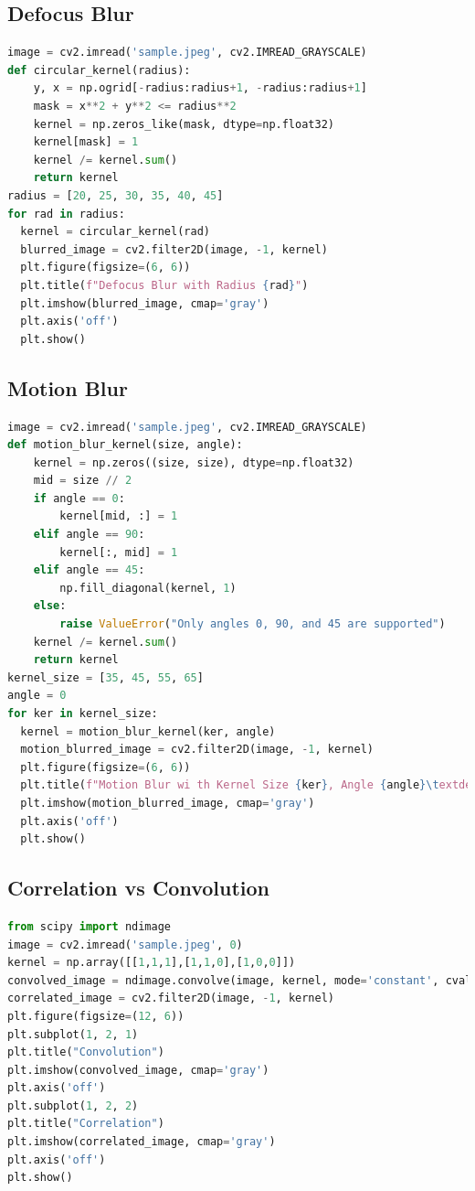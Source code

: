\documentclass{report}
\begin{document}
\subsection{Defocus Blur}
\begin{lstlisting}[language=Python, caption=Defocus Blur Simulation]
image = cv2.imread('sample.jpeg', cv2.IMREAD_GRAYSCALE)
def circular_kernel(radius):
    y, x = np.ogrid[-radius:radius+1, -radius:radius+1]
    mask = x**2 + y**2 <= radius**2
    kernel = np.zeros_like(mask, dtype=np.float32)
    kernel[mask] = 1
    kernel /= kernel.sum()
    return kernel
radius = [20, 25, 30, 35, 40, 45]
for rad in radius:
  kernel = circular_kernel(rad)
  blurred_image = cv2.filter2D(image, -1, kernel)
  plt.figure(figsize=(6, 6))
  plt.title(f"Defocus Blur with Radius {rad}")
  plt.imshow(blurred_image, cmap='gray')
  plt.axis('off')
  plt.show()
\end{lstlisting}

\subsection{Motion Blur}
\begin{lstlisting}[language=Python, caption=Motion Blur Implementation]
image = cv2.imread('sample.jpeg', cv2.IMREAD_GRAYSCALE)
def motion_blur_kernel(size, angle):
    kernel = np.zeros((size, size), dtype=np.float32)
    mid = size // 2
    if angle == 0:
        kernel[mid, :] = 1
    elif angle == 90:
        kernel[:, mid] = 1
    elif angle == 45:
        np.fill_diagonal(kernel, 1)
    else:
        raise ValueError("Only angles 0, 90, and 45 are supported")
    kernel /= kernel.sum()
    return kernel
kernel_size = [35, 45, 55, 65]
angle = 0
for ker in kernel_size:
  kernel = motion_blur_kernel(ker, angle)
  motion_blurred_image = cv2.filter2D(image, -1, kernel)
  plt.figure(figsize=(6, 6))
  plt.title(f"Motion Blur wi th Kernel Size {ker}, Angle {angle}\textdegree")
  plt.imshow(motion_blurred_image, cmap='gray')
  plt.axis('off')
  plt.show()
\end{lstlisting}

\subsection{Correlation vs Convolution}
\begin{lstlisting}[language=Python, caption=Correlation and Convolution Study]
from scipy import ndimage
image = cv2.imread('sample.jpeg', 0)
kernel = np.array([[1,1,1],[1,1,0],[1,0,0]])
convolved_image = ndimage.convolve(image, kernel, mode='constant', cval=1.0)
correlated_image = cv2.filter2D(image, -1, kernel)
plt.figure(figsize=(12, 6))
plt.subplot(1, 2, 1)
plt.title("Convolution")
plt.imshow(convolved_image, cmap='gray')
plt.axis('off')
plt.subplot(1, 2, 2)
plt.title("Correlation")
plt.imshow(correlated_image, cmap='gray')
plt.axis('off')
plt.show()

\end{lstlisting}
\end{document}
